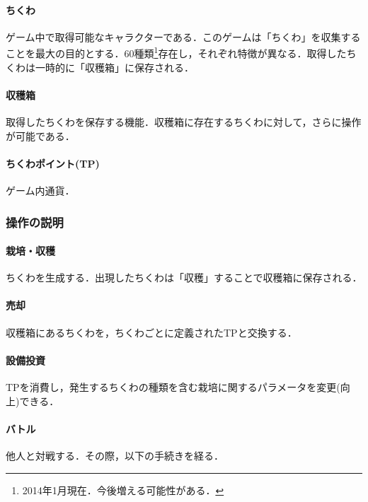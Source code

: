 \documentclass[a4paper,11pt]{jsarticle}
\begin{document}
\paragraph{ちくわ}
ゲーム中で取得可能なキャラクターである．このゲームは「ちくわ」を収集することを最大の目的とする．60種類\footnote{2014年1月現在．今後増える可能性がある．}存在し，それぞれ特徴が異なる．取得したちくわは一時的に「収穫箱」に保存される．

\paragraph{収穫箱}
取得したちくわを保存する機能．収穫箱に存在するちくわに対して，さらに操作が可能である．

\paragraph{ちくわポイント(TP)}
ゲーム内通貨．

\subsubsection{操作の説明}
\paragraph{栽培・収穫}
ちくわを生成する．出現したちくわは「収穫」することで収穫箱に保存される．

\paragraph{売却}
収穫箱にあるちくわを，ちくわごとに定義されたTPと交換する．

\paragraph{設備投資}
TPを消費し，発生するちくわの種類を含む栽培に関するパラメータを変更(向上)できる．

\paragraph{バトル}
他人と対戦する．その際，以下の手続きを経る．
\end{document}
